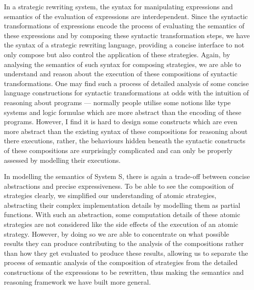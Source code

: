 In a strategic rewriting system, the syntax for manipulating expressions and semantics of the evaluation of expressions are interdependent. Since the syntactic transformations of expressions encode the process of evaluating the semantics of these expressions and by composing these syntactic transformation steps, we have the syntax of a strategic rewriting language, providing a concise interface to not only compose but also control the application of these strategies. Again, by analysing the semantics of such syntax for composing strategies, we are able to understand and reason about the execution of these compositions of syntactic transformations. One may find such a process of detailed analysis of some concise language constructions for syntactic transformations at odds with the intuition of reasoning about programs --- normally people utilise some notions like type systems and logic formulae which are more abstract than the encoding of these programs. However, I find it is hard to design some constructs which are even more abstract than the existing syntax of these compositions for reasoning about there executions, rather, the behaviours hidden beneath the syntactic constructs of these compositions are surprisingly complicated and can only be properly assessed by modelling their executions. 

In modelling the semantics of System S, there is again a trade-off between concise abstractions and precise expressiveness. To be able to see the composition of strategies clearly, we simplified our understanding of atomic strategies, abstracting their complex implementation details by modelling them as partial functions. With such an abstraction, some computation details of these atomic strategies are not considered like the side effects of the execution of an atomic strategy. However, by doing so we are able to concentrate on what possible results they can produce contributing to the analysis of the compositions rather than how they get evaluated to produce these results, allowing us to separate the process of semantic analysis of the composition of strategies from the detailed constructions of the expressions to be rewritten, thus making the semantics and reasoning framework we have built more general.


